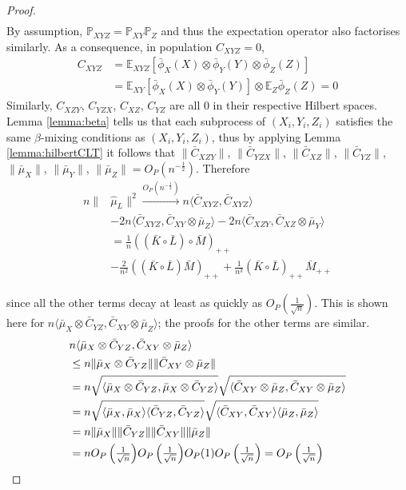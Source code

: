 \documentclass[]{article}
\begin{document}
\begin{proof}
\begin{align*}
\end{align*}
By assumption, $\mathbb{P}_{XYZ} =\mathbb{P}_{XY}\mathbb{P}_{Z}$ and thus the expectation operator also factorises similarly. As a consequence, in population $C_{XYZ}=0$,  
\begin{align*}
C_{XYZ} &= \mathbb{E}_{XYZ}[\bar\phi_X(X)\otimes\bar\phi_Y(Y)\otimes\bar\phi_Z(Z)] \\
& = \mathbb{E}_{XY}[\bar\phi_X(X)\otimes\bar\phi_Y(Y)]\otimes\mathbb{E}_{Z}\bar\phi_Z(Z)=0
\end{align*}
Similarly, $C_{XZY}$, $C_{YZX}$, $C_{XZ}$, $C_{YZ}$ are all 0 in their respective Hilbert spaces. Lemma \ref{lemma:beta} tells us that each subprocess of $(X_i,Y_i,Z_i)$ satisfies the same $\beta$-mixing conditions as $(X_i,Y_i,Z_i)$, thus by applying Lemma \ref{lemma:hilbertCLT} it follows that $\|\bar{C}_{XZY}\|$, $\|\bar{C}_{YZX}\|$, $\|\bar{C}_{XZ}\|$, $\|\bar{C}_{YZ}\|$, $\|\bar{\mu}_X\|$, $\|\bar{\mu}_Y\|$, $\|\bar{\mu}_Z\| = O_P\left(n^{-\frac{1}{2}}\right)$. Therefore
\begin{align*}
n\|&\hat \mu_L\|^2  \xrightarrow{O_P(n^{-\frac{1}{2}})} n\langle \bar{C}_{XYZ},\bar{C}_{XYZ} \rangle \\ &-
2n\langle \bar{C}_{XYZ},\bar{C}_{XY}\otimes\bar{\mu}_Z \rangle -
2n\langle \bar{C}_{XZY},\bar{C}_{XZ}\otimes\bar{\mu}_Y \rangle \\ &=
\frac{1}{n}((\bar{K}\circ \bar{L}) \circ \bar{M})_{++}\\& - \frac{2}{n^2}((\bar{K}\circ \bar{L})\bar{M})_{++} + \frac{1}{n^3}(\bar{K}\circ \bar{L})_{++}\bar{M}_{++}
\end{align*}

since all the other terms decay at least as quickly as $O_P(\frac{1}{\sqrt{n}})$. This is shown here for $n\langle \bar{\mu}_X\otimes\bar{C}_{YZ},\bar{C}_{XY}\otimes\bar{\mu}_Z \rangle$; the proofs for the other terms are similar.
\begin{align*}
&n\langle \bar{\mu}_X\otimes\bar{C}_{YZ},\bar{C}_{XY}\otimes\bar{\mu}_Z \rangle \\
&\leq n \| \bar{\mu}_X\otimes\bar{C}_{YZ}\| \|\bar{C}_{XY}\otimes\bar{\mu}_Z \| \\
& = n\sqrt{\langle \bar{\mu}_X\otimes\bar{C}_{YZ} , \bar{\mu}_X\otimes\bar{C}_{YZ} \rangle} \sqrt{\langle \bar{C}_{XY}\otimes\bar{\mu}_Z, \bar{C}_{XY}\otimes\bar{\mu}_Z \rangle} \\
& = n\sqrt{\langle \bar{\mu}_X, \bar{\mu}_X \rangle \langle \bar{C}_{YZ} , \bar{C}_{YZ} \rangle} \sqrt{\langle \bar{C}_{XY}, \bar{C}_{XY} \rangle \langle \bar{\mu}_Z, \bar{\mu}_Z \rangle} \\
& =  n \| \bar{\mu}_X\|\|\bar{C}_{YZ}\| \|\bar{C}_{XY}\|\|\bar{\mu}_Z \| \\
& = n \mathsmaller{O_P\left(\frac{1}{\sqrt{n}}\right)} \mathsmaller{O_P\left(\frac{1}{\sqrt{n}}\right)} O_P(1) \mathsmaller{O_P\left(\frac{1}{\sqrt{n}}\right)} = \mathsmaller{O_P\left(\frac{1}{\sqrt{n}}\right)}
\end{align*}


\end{proof}
\end{document}
